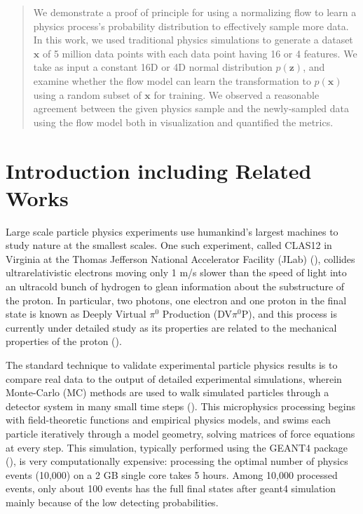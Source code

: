 \begin{abstract}
We demonstrate a proof of principle for using a normalizing flow to learn a physics process's probability distribution to effectively sample more data. In this work, we used traditional physics simulations to generate a dataset $\mathbf{x}$ of 5 million data points with each data point having 16 or 4 features.  We take as input a constant 16D or 4D normal distribution $p(\mathbf{z})$, and examine whether the flow model can learn the transformation to $p(\mathbf{x})$ using a random subset of $\mathbf{x}$ for training. We observed a reasonable agreement between the given physics sample and the newly-sampled data using the flow model both in visualization and quantified the metrics.
\end{abstract}
\section{Introduction including Related Works }

Large scale particle physics experiments use humankind's largest machines to study nature at the smallest scales. One such experiment, called CLAS12 in Virginia at the Thomas Jefferson National Accelerator Facility (JLab) (\citet{BURKERT2020163419}), collides ultrarelativistic electrons moving only 1 m/s slower than the speed of light into an ultracold bunch of hydrogen to glean information about the substructure of the proton. In particular, two photons, one electron and one proton in the final state is known as Deeply Virtual $\pi^0$ Production (DV$\pi^0$P), and this process is currently under detailed study as its properties are related to the mechanical properties of the proton (\citet{PhysRevD.55.7114}).

The standard technique to validate experimental particle physics results is to compare real data to the output of detailed experimental simulations, wherein Monte-Carlo (MC) methods are used to walk simulated particles through a detector system in many small time steps (\citet{PhysRevLett.115.212003, 10.1093/ptep/ptaa104}). This microphysics processing begins with field-theoretic functions and empirical physics models, and swims each particle iteratively through a model geometry, solving matrices of force equations at every step. This simulation, typically performed using the GEANT4 package (\citet{AGOSTINELLI2003250}), is very computationally expensive: processing the optimal number of physics events (10,000) on a 2 GB single core takes 5 hours. Among 10,000 processed events, only about 100 events has the full final states after geant4 simulation mainly because of the low detecting probabilities.

